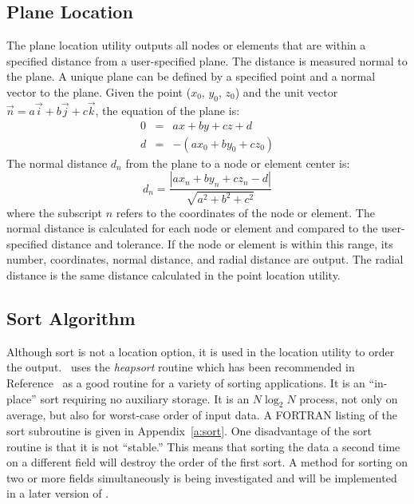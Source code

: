 \subsection{Plane Location}\label{sec:slocate}
The plane location utility outputs all nodes or elements that are within
a specified distance from a user-specified plane.  The distance is
measured normal to the plane. A unique plane can be defined by a
specified point and a normal vector to the plane.  Given the point
($x_0$, $y_0$, $z_0$) and the unit vector $\vec{n} = a\vec{i} + b\vec{j} +
c\vec{k}$, the equation of the plane is:
\begin{eqnarray}
0 &=& ax + by + cz + d      \label{plane} \\
d &=& -( ax_0 + by_0 + cz_0 )
\end{eqnarray}
The normal distance $d_n$ from the plane to a node or
element center is:
\begin{equation}
d_n = \frac{\left| a x_n + b y_n + c z_n - d\right|}%
                                    {\sqrt{a^2 + b^2 + c^2}}
\end{equation}
where the subscript $n$ refers to the coordinates of the node or
element.  The normal distance is calculated for each node or element and
compared to the user-specified distance and tolerance.  If the node or
element is within this range, its number, coordinates, normal distance,
and radial distance are output.  The radial distance is the same
distance calculated in the point location utility.

\subsection{Sort Algorithm}

Although sort is not a location option, it is used in the location
utility to order the output.  \numbers\ uses the {\em heapsort} routine
which has been recommended in Reference~\cite{Press:nr} as a good
routine for a variety of sorting applications.  It is an ``in-place''
sort requiring no auxiliary storage.  It is an $N\log_2N$ process, not
only on average, but also for worst-case order of input data.  A FORTRAN
listing of the sort subroutine is given in Appendix~\ref{a:sort}.  One
disadvantage of the sort routine is that it is not ``stable.''  This
means that sorting the data a second time on a different field will
destroy the order of the first sort.  A method for sorting on two or
more fields simultaneously is being investigated and will be implemented
in a later version of \numbers.

